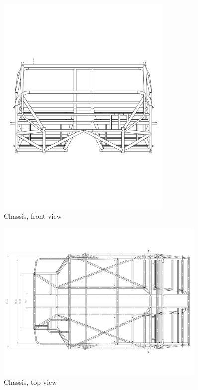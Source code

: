 \documentclass[10pt]{article}
\begin{document}
\begin{figure}
\centering
\includegraphics[width=0.75\textwidth]{figures/chassis-front}
\caption{Chassis, front view}
\label{fig:chassis-front}
\end{figure}
\begin{figure}
\centering
\includegraphics[width=0.9\textwidth]{figures/chassis-top}
\caption{Chassis, top view}
\label{fig:chassis-top}
\end{figure}
\end{document}
